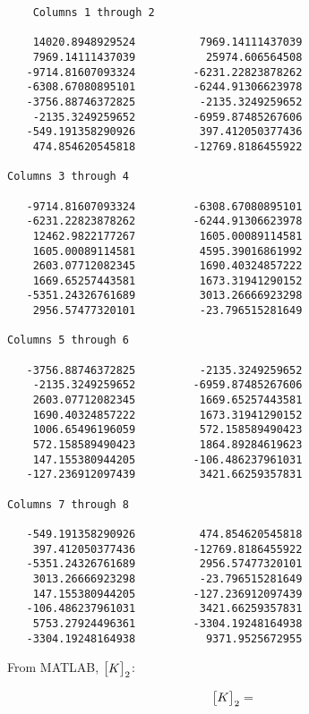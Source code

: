 \documentclass[../main.tex]{subfiles}
\begin{document}
\begin{verbatim}
    Columns 1 through 2

    14020.8948929524          7969.14111437039
    7969.14111437039           25974.606564508
   -9714.81607093324         -6231.22823878262
   -6308.67080895101         -6244.91306623978
   -3756.88746372825          -2135.3249259652
    -2135.3249259652         -6959.87485267606
   -549.191358290926          397.412050377436
    474.854620545818         -12769.8186455922

Columns 3 through 4

   -9714.81607093324         -6308.67080895101
   -6231.22823878262         -6244.91306623978
    12462.9822177267          1605.00089114581
    1605.00089114581          4595.39016861992
    2603.07712082345          1690.40324857222
    1669.65257443581          1673.31941290152
   -5351.24326761689          3013.26666923298
    2956.57477320101          -23.796515281649

Columns 5 through 6

   -3756.88746372825          -2135.3249259652
    -2135.3249259652         -6959.87485267606
    2603.07712082345          1669.65257443581
    1690.40324857222          1673.31941290152
    1006.65496196059          572.158589490423
    572.158589490423          1864.89284619623
    147.155380944205         -106.486237961031
   -127.236912097439          3421.66259357831

Columns 7 through 8

   -549.191358290926          474.854620545818
    397.412050377436         -12769.8186455922
   -5351.24326761689          2956.57477320101
    3013.26666923298          -23.796515281649
    147.155380944205         -127.236912097439
   -106.486237961031          3421.66259357831
    5753.27924496361         -3304.19248164938
   -3304.19248164938           9371.9525672955

\end{verbatim}

From MATLAB, \(\mqty[K]_2\):

\[
    \mqty[K]_2 =  
\]
\end{document}

